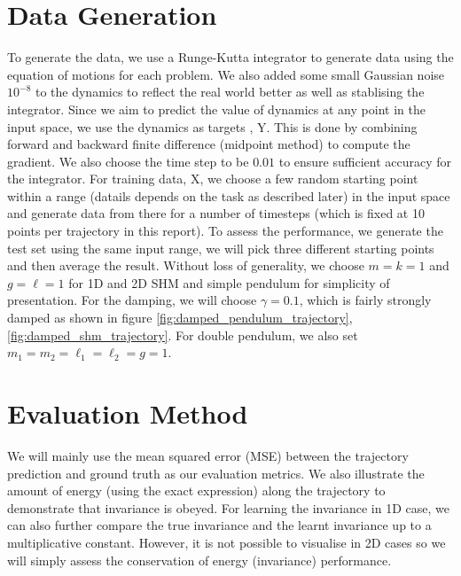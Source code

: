\documentclass{statsmsc}
\begin{document}
\section{Data Generation}
To generate the data, we use a Runge-Kutta integrator to generate data using the equation of motions for each problem. 
We also added some small Gaussian noise $10^{-8}$ to the dynamics to reflect the real world better as well as stablising the integrator.
Since we aim to predict the value of dynamics at any point in the input space, we use the dynamics as targets , Y. 
This is done by combining forward and backward finite difference (midpoint method) to compute the gradient. 
We also choose the time step to be $0.01$ to ensure sufficient accuracy for the integrator.
For training data, X, we choose a few random starting point within a range (datails depends on the task as described later) in the input space and generate data from there for a number of timesteps (which is fixed at 10 points per trajectory in this report). 
To assess the performance, we generate the test set using the same input range, we will pick three different starting points and then average the result.
Without loss of generality, we choose $m=k=1$ and $g=\ell=1$ for 1D and 2D SHM and simple pendulum for simplicity of presentation. 
For the damping, we will choose $\gamma= 0.1$, which is fairly strongly damped as shown in figure \ref{fig:damped_pendulum_trajectory}, \ref{fig:damped_shm_trajectory}. 
For double pendulum, we also set $m_1=m_2=\ell_1=\ell_2=g=1.$

\section{Evaluation Method}
We will mainly use the mean squared error (MSE) between the trajectory prediction and ground truth as our evaluation metrics. 
We also illustrate the amount of energy (using the exact expression) along the trajectory to demonstrate that invariance is obeyed.
For learning the invariance in 1D case, we can also further compare the true invariance and the learnt invariance up to a multiplicative constant.
However, it is not possible to visualise in 2D cases so we will simply assess the conservation of energy (invariance) performance.
\end{document}
